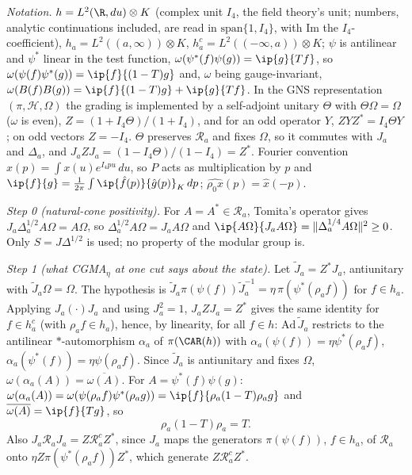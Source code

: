 \emph{Notation.} $h = L^{2}(\R, du)\otimes K$ (complex unit $I_{4}$, the field theory's unit; numbers, analytic continuations included, are read in $\mathrm{span}\{1, I_{4}\}$, with $\mathrm{Im}$ the $I_{4}$-coefficient), $h_{a} = L^{2}((a, \infty))\otimes K$, $h_{a}^{c} = L^{2}((-\infty, a))\otimes K$; $\psi$ is antilinear and $\psi^{*}$ linear in the test function, $\omega(\psi^{*}(f)\psi(g)) = \ip{g}{Tf}$, so $\omega(\psi(f)\psi^{*}(g)) = \ip{f}{(1 - T)g}$ and, $\omega$ being gauge-invariant, $\omega(B(f)B(g)) = \ip{f}{(1 - T)g} + \ip{g}{Tf}$. In the GNS representation $(\pi, \mathcal{H}, \Omega)$ the grading is implemented by a self-adjoint unitary $\Theta$ with $\Theta\Omega = \Omega$ ($\omega$ is even), $Z = (1 + I_{4}\Theta)/(1 + I_{4})$, and for an odd operator $Y$, $ZYZ^{*} = I_{4}\Theta Y$; on odd vectors $Z = -I_{4}$. $\Theta$ preserves $\mathcal{R}_{a}$ and fixes $\Omega$, so it commutes with $J_{a}$ and $\Delta_{a}$, and $J_{a}ZJ_{a} = (1 - I_{4}\Theta)/(1 - I_{4}) = Z^{*}$. Fourier convention $\hat x(p) = \int x(u)e^{I_{4}pu}\,du$, so $P$ acts as multiplication by $p$ and $\ip{f}{g} = \tfrac{1}{2\pi}\int \ip{\hat f(p)}{\hat g(p)}_{K}\,dp$; $\widehat{\rho_{0}x}(p) = \hat x(-p)$.

\emph{Step 0 (natural-cone positivity).} For $A = A^{*} \in \mathcal{R}_{a}$, Tomita's operator gives $J_{a}\Delta_{a}^{1/2}A\Omega = A\Omega$, so $\Delta_{a}^{1/2}A\Omega = J_{a}A\Omega$ and $\ip{A\Omega}{J_{a}A\Omega} = \|\Delta_{a}^{1/4}A\Omega\|^{2} \ge 0$. Only $S = J\Delta^{1/2}$ is used; no property of the modular group is.

\emph{Step 1 (what CGMA$_{\eta}$ at one cut says about the state).} Let $\tilde J_{a} = Z^{*}J_{a}$, antiunitary with $\tilde J_{a}\Omega = \Omega$. The hypothesis is $\tilde J_{a}\pi(\psi(f))\tilde J_{a}^{-1} = \eta\,\pi(\psi^{*}(\rho_{a}f))$ for $f \in h_{a}$. Applying $J_{a}(\cdot)J_{a}$ and using $J_{a}^{2} = 1$, $J_{a}ZJ_{a} = Z^{*}$ gives the same identity for $f \in h_{a}^{c}$ (with $\rho_{a}f \in h_{a}$), hence, by linearity, for all $f \in h$: $\mathrm{Ad}\,\tilde J_{a}$ restricts to the antilinear $*$-automorphism $\alpha_{a}$ of $\pi(\CAR(h))$ with $\alpha_{a}(\psi(f)) = \eta\psi^{*}(\rho_{a}f)$, $\alpha_{a}(\psi^{*}(f)) = \eta\psi(\rho_{a}f)$. Since $\tilde J_{a}$ is antiunitary and fixes $\Omega$, $\omega(\alpha_{a}(A)) = \overline{\omega(A)}$. For $A = \psi^{*}(f)\psi(g)$: $\omega(\alpha_{a}(A)) = \omega(\psi(\rho_{a}f)\psi^{*}(\rho_{a}g)) = \ip{f}{\rho_{a}(1 - T)\rho_{a}g}$ and $\overline{\omega(A)} = \ip{f}{Tg}$, so
\[ \rho_{a}(1 - T)\rho_{a} = T. \tag{1} \]
Also $J_{a}\mathcal{R}_{a}J_{a} = Z\mathcal{R}_{a}^{c}Z^{*}$, since $J_{a}$ maps the generators $\pi(\psi(f))$, $f \in h_{a}$, of $\mathcal{R}_{a}$ onto $\eta Z\pi(\psi^{*}(\rho_{a}f))Z^{*}$, which generate $Z\mathcal{R}_{a}^{c}Z^{*}$.

